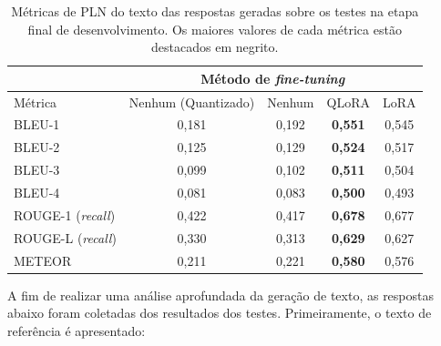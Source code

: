 \begin{table}[ht]
    \caption{\small Métricas de \ac{PLN} do texto das respostas geradas sobre os testes na etapa final de
    desenvolvimento. Os maiores valores de cada métrica estão destacados em negrito.}
    \centering
    \begin{tabular}{l|c|c|c|c}
        \hline
                                       & \multicolumn{4}{c}{Método de \textit{fine-tuning}}
        \\ \hline
        Métrica                        & Nenhum (Quantizado)                                & Nenhum & \ac{QLoRA}
                                       & \ac{LoRA}
        \\ \hline
        \ac{BLEU}-1                    & 0,181                                              & 0,192  & \textbf{0,551}
                                       & 0,545
        \\
        \ac{BLEU}-2                    & 0,125                                              & 0,129  & \textbf{0,524}
                                       & 0,517
        \\
        \ac{BLEU}-3                    & 0,099                                              & 0,102  & \textbf{0,511}
                                       & 0,504
        \\
        \ac{BLEU}-4                    & 0,081                                              & 0,083  & \textbf{0,500}
                                       & 0,493
        \\
        \hline
        \ac{ROUGE}-1 (\textit{recall}) & 0,422                                              & 0,417  & \textbf{0,678}
                                       & 0,677
        \\
        \ac{ROUGE}-L (\textit{recall}) & 0,330                                              & 0,313  & \textbf{0,629}
                                       & 0,627
        \\
        \hline
        \ac{METEOR}                    & 0,211                                              & 0,221  & \textbf{0,580}
                                       & 0,576
        \\
        \hline
    \end{tabular}
    \label{tab:overall_nlp_metrics}
\end{table}

A fim de realizar uma análise aprofundada da geração de texto, as respostas abaixo foram coletadas dos resultados dos
testes. Primeiramente, o texto de referência é apresentado:

